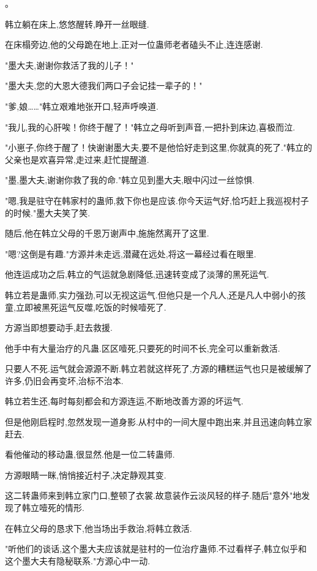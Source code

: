 
\begin{this_body}

。

韩立躺在床上,悠悠醒转,睁开一丝眼缝.

在床榻旁边,他的父母跪在地上,正对一位蛊师老者磕头不止,连连感谢.

"墨大夫,谢谢你救活了我的儿子！"

"墨大夫,您的大恩大德我们两口子会记挂一辈子的！"

"爹,娘……"韩立艰难地张开口,轻声呼唤道.

"我儿,我的心肝唉！你终于醒了！"韩立之母听到声音,一把扑到床边,喜极而泣.

"小崽子,你终于醒了！快谢谢墨大夫,要不是他恰好走到这里,你就真的死了."韩立的父亲也是欢喜异常,走过来,赶忙提醒道.

"墨,墨大夫,谢谢你救了我的命."韩立见到墨大夫,眼中闪过一丝惊惧.

"嗯,我是驻守在韩家村的蛊师,救下你也是应该.你今天运气好,恰巧赶上我巡视村子的时候."墨大夫笑了笑.

随后,他在韩立父母的千恩万谢声中,施施然离开了这里.

"嗯?这倒是有趣."方源并未走远,潜藏在远处,将这一幕经过看在眼里.

他连运成功之后,韩立的气运就急剧降低,迅速转变成了淡薄的黑死运气.

韩立若是蛊师,实力强劲,可以无视这运气.但他只是一个凡人,还是凡人中弱小的孩童,立即被黑死运气反噬,吃饭的时候噎死了.

方源当即想要动手,赶去救援.

他手中有大量治疗的凡蛊.区区噎死,只要死的时间不长,完全可以重新救活.

只要人不死.运气就会源源不断.韩立若就这样死了,方源的糟糕运气也只是被缓解了许多,仍旧会再变坏,治标不治本.

韩立若生还,每时每刻都会和方源连运,不断地改善方源的坏运气.

但是他刚启程时,忽然发现一道身影.从村中的一间大屋中跑出来,并且迅速向韩立家赶去.

看他催动的移动蛊,很显然.他是一位二转蛊师.

方源眼睛一眯,悄悄接近村子,决定静观其变.

这二转蛊师来到韩立家门口,整顿了衣裳.故意装作云淡风轻的样子.随后"意外"地发现了韩立噎死的情形.

在韩立父母的恳求下,他当场出手救治,将韩立救活.

"听他们的谈话,这个墨大夫应该就是驻村的一位治疗蛊师.不过看样子,韩立似乎和这个墨大夫有隐秘联系."方源心中一动.


\end{this_body}
